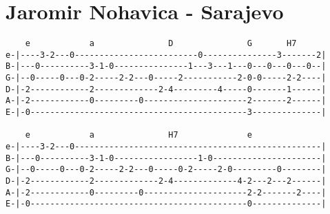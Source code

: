 \section{Jaromir Nohavica - Sarajevo}
\begin{verbatim}
    e            a               D               G       H7
e-|----3-2---0-------------------------0---------------3-------2|
B-|---0----------3-1-0---------------1---3---1---0---0---0---0--|
G-|--0-----0---0-2-----2-2---0-----2-----------2-0-0-----2-2----|
D-|-2------------2-------------2-4---------4-----0-------1------|
A-|-2------------0---------0---------------------2-------2------|
E-|-0--------------------------------------------3--------------|

    e            a               H7              e
e-|----3-2---0--------------------------------------------------|
B-|---0----------3-1-0-----------------1-0----------------------|
G-|--0-----0---0-2-----2-2---0-----0-2-----2-0---------0--------|
D-|-2------------2-------------2-4-------------4-2---2---2------|
A-|-2------------0---------0---------------------2-2-------2----|
E-|-0--------------------------------------------0--------------|

\end{verbatim}
\newpage


